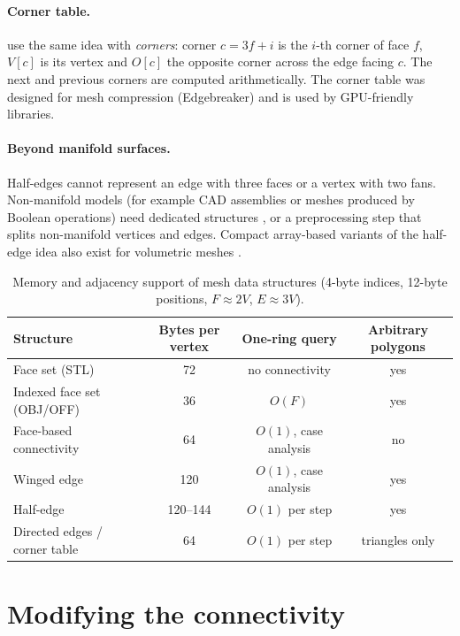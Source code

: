 \paragraph{Corner table.} \citet{Rossignac2001} use the same idea with \emph{corners}: corner
$c=3f+i$ is the $i$-th corner of face $f$, $V[c]$ is its vertex and $O[c]$ the opposite corner
across the edge facing $c$. The next and previous corners are computed arithmetically. The corner
table was designed for mesh compression (Edgebreaker) and is used by GPU-friendly libraries.

\paragraph{Beyond manifold surfaces.} Half-edges cannot represent an edge with three faces or a
vertex with two fans. Non-manifold models (for example CAD assemblies or meshes produced by
Boolean operations) need dedicated structures \citep{DeFloriani2003}, or a preprocessing step that
splits non-manifold vertices and edges. Compact array-based variants of the half-edge idea also exist
for volumetric meshes \citep{Lage2005}.

\begin{table}[tbp]
\centering\small
\begin{tabular}{@{}lccc@{}}
\toprule
Structure & Bytes per vertex & One-ring query & Arbitrary polygons \\
\midrule
Face set (STL) & 72 & no connectivity & yes \\
Indexed face set (OBJ/OFF) & 36 & $O(F)$ & yes \\
Face-based connectivity & 64 & $O(1)$, case analysis & no \\
Winged edge & 120 & $O(1)$, case analysis & yes \\
Half-edge & 120--144 & $O(1)$ per step & yes \\
Directed edges / corner table & 64 & $O(1)$ per step & triangles only \\
\bottomrule
\end{tabular}
\caption{Memory and adjacency support of mesh data structures (4-byte indices, 12-byte
positions, $F\approx2V$, $E\approx3V$).}
\label{tab:ds}
\end{table}

\section{Modifying the connectivity}

